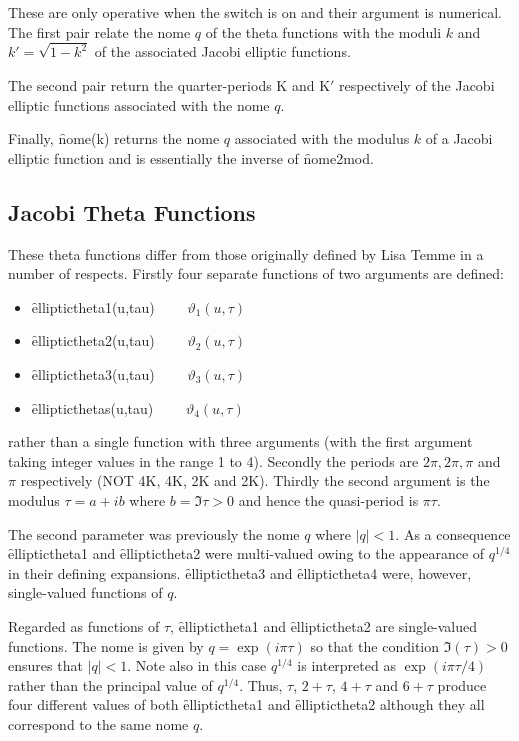 These are only operative when the switch  is on and their
argument is numerical. The first pair relate the nome $q$ of the theta
functions with the moduli $k$ and $k'=\sqrt{1-k^2}$ of the associated Jacobi
elliptic functions.

The second pair return the quarter-periods K and K$'$ respectively of
the Jacobi elliptic functions associated with the nome $q$.

Finally, \f{nome(k)} returns the nome $q$ associated with the modulus $k$ of
a Jacobi elliptic function and is essentially the inverse of \f{nome2mod}.

\subsection{Jacobi Theta Functions}
\hypertarget{JACTF}{}
These theta functions differ from those originally defined by Lisa Temme
in a number of respects.
Firstly four separate functions of two arguments are defined:
\hypertarget{operator:ELLIPTICTHETA1}{}
\hypertarget{operator:ELLIPTICTHETA2}{}
\hypertarget{operator:ELLIPTICTHETA3}{}
\hypertarget{operator:ELLIPTICTHETA4}{}
 
 
\begin{itemize}
\item \f{elliptictheta1(u,tau)} $\qquad \vartheta_1(u, \tau)$
\item \f{elliptictheta2(u,tau)} $\qquad \vartheta_2(u, \tau)$
\item \f{elliptictheta3(u,tau)} $\qquad \vartheta_3(u, \tau)$
\item \f{ellipticthetas(u,tau)} $\qquad \vartheta_4(u, \tau)$
\end{itemize}

rather than a single function with three arguments (with the first argument
taking integer values in the range 1 to 4).
Secondly the periods are $2\pi, 2\pi, \pi$ and $\pi$ respectively
(NOT 4K, 4K, 2K and 2K).
Thirdly the second argument is the modulus $\tau = a+i b$ where $b=\Im\tau>0$
and hence the quasi-period is $\pi\tau$.

The second parameter was previously the nome $q$
where $|q|<1$. As a consequence \f{elliptictheta1} and \f{elliptictheta2} were
multi-valued owing to the appearance of $q^{1/4}$ in their defining expansions.
\f{elliptictheta3} and \f{elliptictheta4} were, however, single-valued
functions of $q$.

Regarded as functions of $\tau$,
\f{elliptictheta1} and \f{elliptictheta2} are single-valued functions. The nome
is given by $q = \exp(i\pi\tau)$  so that the condition $\Im(\tau)>0$ ensures
that $|q| < 1$. Note also  in this case $q^{1/4}$ is interpreted as
$\exp(i\pi\tau/4)$ rather than the principal value of $q^{1/4}$.
Thus, $\tau$, $2+\tau$, $4+\tau$ and $6+\tau$ produce four different values of
both \f{elliptictheta1} and \f{elliptictheta2} although they all correspond to
the same nome $q$.

